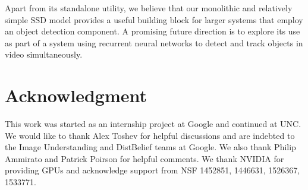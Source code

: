 \documentclass[runningheads]{llncs}
\begin{document}
Apart from its standalone utility, we believe that our monolithic and relatively simple SSD model provides a useful building block for larger systems that employ an object detection component. A promising future direction is to explore its use as part of a system using recurrent neural networks to detect and track objects in video simultaneously.

\section{Acknowledgment}
\noindent This work was started as an internship project at Google and continued at UNC. We would like to thank Alex Toshev for helpful discussions and are indebted to the Image Understanding and DistBelief teams at Google. We also thank Philip Ammirato and Patrick Poirson for helpful comments. We thank NVIDIA for providing GPUs and acknowledge support from NSF 1452851, 1446631, 1526367, 1533771.


\end{document}

